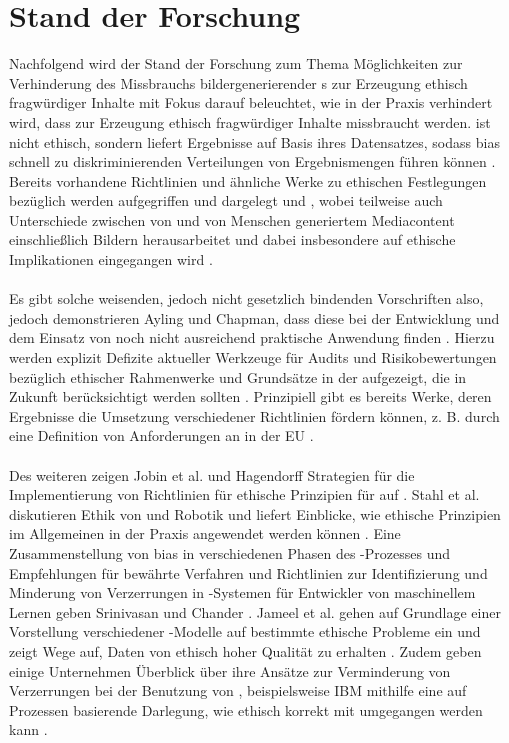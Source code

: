\chapter{Stand der Forschung}

Nachfolgend wird der Stand der Forschung zum Thema Möglichkeiten zur Verhinderung des Missbrauchs bildergenerierender s zur Erzeugung ethisch fragwürdiger Inhalte mit Fokus darauf beleuchtet, wie in der Praxis verhindert wird, dass  zur Erzeugung ethisch fragwürdiger Inhalte missbraucht werden.  ist nicht ethisch, sondern liefert Ergebnisse auf Basis ihres Datensatzes, sodass \Gls{bias} schnell zu diskriminierenden Verteilungen von Ergebnismengen führen können \cite{Salminen}. Bereits vorhandene Richtlinien und ähnliche Werke zu ethischen Festlegungen bezüglich  werden aufgegriffen und dargelegt \cite{Jobin} und \cite{Partadiredja}, wobei teilweise auch Unterschiede zwischen von  und von Menschen generiertem Mediacontent einschließlich Bildern herausarbeitet und dabei insbesondere auf ethische Implikationen eingegangen wird \cite{Partadiredja}. 
\\\\
Es gibt solche weisenden, jedoch nicht gesetzlich bindenden Vorschriften also, jedoch demonstrieren Ayling und Chapman, dass diese bei der Entwicklung und dem Einsatz von  noch nicht ausreichend praktische Anwendung finden \cite{Ayling}. Hierzu werden explizit Defizite aktueller Werkzeuge für Audits und Risikobewertungen bezüglich ethischer Rahmenwerke und Grundsätze in der  aufgezeigt, die in Zukunft berücksichtigt werden sollten \cite{Ayling}. Prinzipiell gibt es bereits Werke, deren Ergebnisse die Umsetzung verschiedener Richtlinien fördern können, z. B. durch eine Definition von Anforderungen an  in der EU \cite{EUCommision}. 
\\\\
Des weiteren zeigen Jobin et al. und Hagendorff Strategien für die Implementierung von Richtlinien für ethische Prinzipien für  auf \cite{Jobin} \cite{Hagendorff}. Stahl et al. diskutieren Ethik von  und Robotik und liefert Einblicke, wie ethische Prinzipien im Allgemeinen in der Praxis angewendet werden können \cite{Stahl}. Eine Zusammenstellung von \Gls{bias} in verschiedenen Phasen des -Prozesses und Empfehlungen für bewährte Verfahren und Richtlinien zur Identifizierung und Minderung von Verzerrungen in -Systemen für Entwickler von maschinellem Lernen geben Srinivasan und Chander \cite{Srinivasan}. Jameel et al. gehen auf Grundlage einer Vorstellung verschiedener -Modelle auf bestimmte ethische Probleme ein und zeigt Wege auf, Daten von ethisch hoher Qualität zu erhalten \cite{Jameel}. Zudem geben einige Unternehmen Überblick über ihre Ansätze zur Verminderung von Verzerrungen bei der Benutzung von , beispielsweise IBM mithilfe eine auf Prozessen basierende Darlegung, wie ethisch korrekt mit  umgegangen werden kann \cite{Hobson}.
